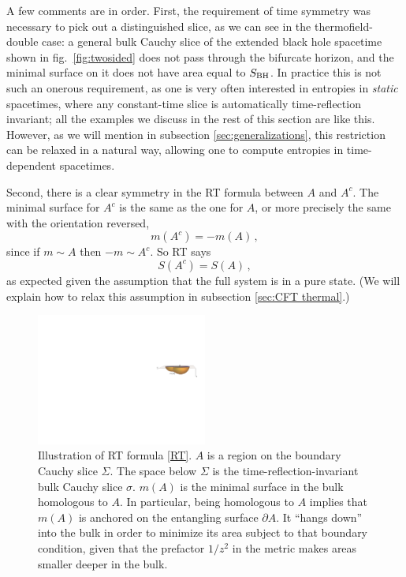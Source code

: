 \documentclass[11pt]{article}
\begin{document}
A few comments are in order. First, the requirement of time symmetry was necessary to pick out a distinguished slice, as we can see in the thermofield-double case: a general bulk Cauchy slice of the extended black hole spacetime shown in fig.\ \ref{fig:twosided} does not pass through the bifurcate horizon, and the minimal surface on it does not have area equal to $S_{\rm BH}$. In practice this is not such an onerous requirement, as one is very often interested in entropies in \emph{static} spacetimes, where any constant-time slice is automatically time-reflection invariant; all the examples we discuss in the rest of this section are like this. However, as we will mention in subsection \ref{sec:generalizations}, this restriction can be relaxed in a natural way, allowing one to compute entropies in time-dependent spacetimes.

Second, there is a clear symmetry in the RT formula between $A$ and $A^c$. The minimal surface for $A^c$ is the same as the one for $A$, or more precisely the same with the orientation reversed,
\begin{equation}\label{pure m equal}
m(A^c) = -m(A)\,,
\end{equation}
since if $m\sim A$ then $-m\sim A^c$. So RT says
\begin{equation}\label{pure S equal}
S(A^c) = S(A)\,,
\end{equation}
as expected given the assumption that the full system is in a pure state. (We will explain how to relax this assumption in subsection \ref{sec:CFT thermal}.)

\begin{figure}[tbp]
\centering
\includegraphics[width=0.5\textwidth]{figs/3Ddressed}
\caption{\label{fig:3Ddressed}
Illustration of RT formula \eqref{RT}. $A$ is a region on the boundary Cauchy slice $\Sigma$. The space below $\Sigma$ is the time-reflection-invariant bulk Cauchy slice $\sigma$. $m(A)$ is the minimal surface in the bulk homologous to $A$. In particular, being homologous to $A$ implies that $m(A)$ is anchored on the entangling surface $\partial A$. It ``hangs down'' into the bulk in order to minimize its area subject to that boundary condition, given that the prefactor $1/z^2$ in the metric makes areas smaller deeper in the bulk.
}
\end{figure}
\end{document}
